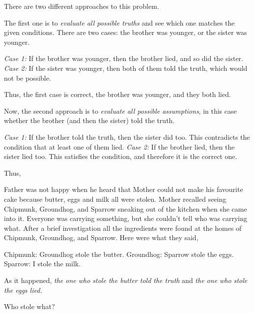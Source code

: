 \documentclass{article}
\begin{document}
\begin{soln}
    There are two different approaches to this problem.

    The first one is to \textit{evaluate all possible truths} and see which one matches the given conditions.
    There are two cases: the brother was younger, or the sister was younger.  
    \begin{itemize}[topsep=0pt, partopsep=0pt, itemsep=0pt]
        \ii \textit{Case 1:} If the brother was younger, then the brother lied, and so did the sister.
        \ii \textit{Case 2:} If the sister was younger, then both of them told the truth, which would not be possible.
    \end{itemize}    
    Thus, the first case is correct, the brother was younger, and they both lied.
    
    Now, the second approach is to \textit{evaluate all possible assumptions},
    in this case whether the brother (and then the sister) told the truth.
    \begin{itemize}[topsep=0pt, partopsep=0pt, itemsep=0pt]
        \ii \textit{Case 1:} If the brother told the truth, then the sister did too.
        This contradicts the condition that at least one of them lied.
        \ii \textit{Case 2:} If the brother lied, then the sister lied too.
        This satisfies the condition, and therefore it is the correct one.
    \end{itemize}    

    Thus, 
\end{soln}

\begin{example*}
    \label{example:pi-2022-4-p8}
    Father was not happy when he heard that Mother could not make his favourite cake because butter, eggs and milk all were stolen.
    Mother recalled seeing Chipmunk, Groundhog, and Sparrow sneaking out of the kitchen when she came into it.
    Everyone was carrying something, but she couldn't tell who was carrying what.
    After a brief investigation all the ingredients were found at the homes of Chipmunk, Groundhog, and Sparrow.
    Here were what they said,
    \begin{itemize}[topsep=0pt, partopsep=0pt, itemsep=0pt]
        \ii Chipmunk: Groundhog stole the butter.
        \ii Groundhog: Sparrow stole the eggs.
        \ii Sparrow: I stole the milk.
    \end{itemize}
    As it happened, \textit{the one who stole the butter told the truth} and \textit{the one who stole the eggs lied.}

    Who stole what?
\end{example*}
\end{document}
